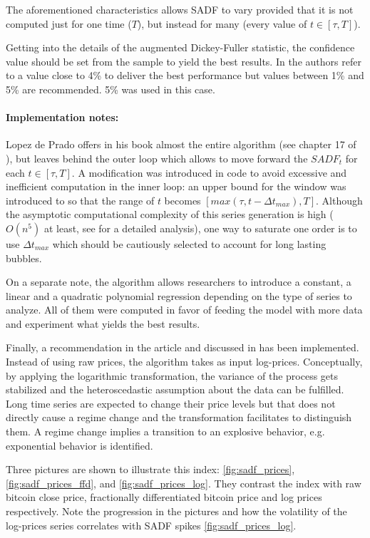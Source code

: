 The aforementioned characteristics allows SADF to vary provided that it is not
computed just for one time ($T$), but instead for many (every value of
$t \in [\tau, T]$).

Getting into the details of the augmented Dickey-Fuller statistic, the
confidence value should be set from the sample to yield the best results. In
\cite{sadf_paper} the authors refer to a value close to 4\% to deliver the best
performance but values between 1\% and 5\% are recommended. 5\% was used in this
case.

\paragraph{Implementation notes:} Lopez de Prado offers in his book almost
the entire algorithm (see chapter 17 of \cite{lopez_de_prado}), but leaves
behind the outer loop which allows to move forward the $SADF_{t}$ for each
$t \in [\tau, T]$. A modification was introduced in code to avoid excessive and
inefficient computation in the inner loop: an upper bound for the window was
introduced to so that the range of $t$ becomes $[max(\tau, t - \Delta t_{max}), T]$.
Although the asymptotic computational complexity of this series generation is
high ($O(n^5)$ at least, see \cite{lopez_de_prado} for a detailed analysis), one
way to saturate one order is to use $\Delta t_{max}$ which should be cautiously
selected to account for long lasting bubbles.

On a separate note, the algorithm allows researchers to introduce a constant, a
linear and a quadratic polynomial regression depending on the type of series to
analyze. All of them were computed in favor of feeding the model with more data
and experiment what yields the best results.

Finally, a recommendation in the article \cite{sadf_paper} and discussed in
\cite{lopez_de_prado} has been implemented. Instead of using raw prices, the
algorithm takes as input log-prices. Conceptually, by applying the logarithmic
transformation, the variance of the process gets stabilized and the
heteroscedastic assumption about the data can be fulfilled. Long time series
are expected to change their price levels but that does not directly cause a
regime change and the transformation facilitates to distinguish them. A regime
change implies a transition to an explosive behavior, e.g. exponential behavior
is identified.

Three pictures are shown to illustrate this index: \ref{fig:sadf_prices},
\ref{fig:sadf_prices_ffd}, and \ref{fig:sadf_prices_log}. They contrast the
index with raw bitcoin close price, fractionally differentiated bitcoin price
and log prices respectively. Note the progression in the pictures and how the 
volatility of the log-prices series correlates with SADF spikes
\ref{fig:sadf_prices_log}.

